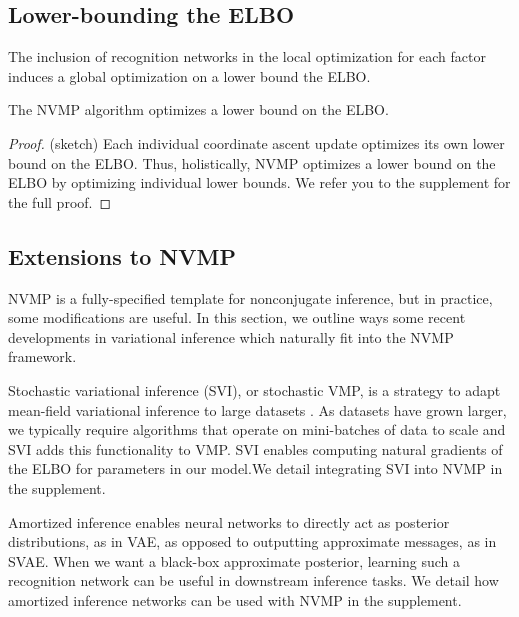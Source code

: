 \subsection{Lower-bounding the ELBO}
The inclusion of recognition networks
in the local optimization for each factor
induces a global
optimization on a lower bound the ELBO. 

\begin{theorem}
\label{thm:lowerbound}
The NVMP algorithm optimizes a lower bound on the ELBO.
\begin{proof}
 (sketch) Each individual coordinate ascent update optimizes its own lower bound on the ELBO. Thus, holistically, NVMP optimizes a lower bound on the ELBO by optimizing individual lower bounds. We refer you to the supplement for the full proof.
\end{proof}
\end{theorem}

\subsection{Extensions to NVMP}
\label{sec:extensions}

NVMP is a fully-specified template 
for nonconjugate inference, but in practice,
some modifications are useful. In this section,
we outline ways some recent
developments in variational inference which naturally fit
into the NVMP framework.

Stochastic variational inference (SVI), or stochastic VMP, is
a strategy to adapt mean-field variational inference
to large datasets \cite{svi}. As datasets
have grown larger, we typically require
algorithms that operate on mini-batches
of data to scale and SVI adds this functionality to VMP. 
SVI enables computing natural gradients of the ELBO for parameters in our model.We detail integrating SVI into NVMP in the supplement.


Amortized inference enables neural networks
to directly act as posterior distributions, as in VAE, as opposed to outputting approximate messages, as in SVAE. When we want a black-box approximate posterior, learning such a recognition network can be useful in downstream inference tasks. We detail how 
amortized inference networks can be used with NVMP in the supplement.

